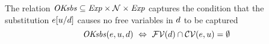 The relation $\mathit{OKsbs}\subseteq\mathit{Exp}\times\mathcal{N}\times\mathit{Exp}$ captures the condition
that the substitution $e[u/d]$ causes no free variables in $d$ to
be captured
\[
\mathit{OKsbs}(e,u,d)\ \Leftrightarrow\ \mathcal{FV}(d)\cap\mathcal{CV}(e,u)=\emptyset
\]



